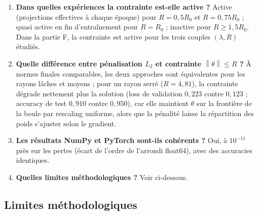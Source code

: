 \documentclass[11pt,a4paper]{article}
\newcommand{\norm}[1]{\left\lVert #1 \right\rVert}
\begin{document}
\begin{enumerate}
  \item \textbf{Dans quelles expériences la contrainte est-elle active ?} Active (projections effectives à chaque époque) pour $R = 0{,}5R_0$ et $R = 0{,}75R_0$ ; quasi active en fin d'entraînement pour $R = R_0$ ; inactive pour $R \ge 1{,}5R_0$. Dans la partie F, la contrainte est active pour les trois couples $(\lambda, R)$ étudiés.
  \item \textbf{Quelle différence entre pénalisation $L_2$ et contrainte $\norm{\theta} \le R$ ?} À normes finales comparables, les deux approches sont équivalentes pour les rayons lâches et moyens ; pour un rayon serré ($R = 4{,}81$), la contrainte dégrade nettement plus la solution (loss de validation $0{,}223$ contre $0{,}123$ ; accuracy de test $0{,}910$ contre $0{,}950$), car elle maintient $\theta$ sur la frontière de la boule par rescaling uniforme, alors que la pénalité laisse la répartition des poids s'ajuster selon le gradient.
  \item \textbf{Les résultats NumPy et PyTorch sont-ils cohérents ?} Oui, à $10^{-11}$ près sur les pertes (écart de l'ordre de l'arrondi float64), avec des accuracies identiques.
  \item \textbf{Quelles limites méthodologiques ?} Voir ci-dessous.
\end{enumerate}

\subsection{Limites méthodologiques}
\end{document}
